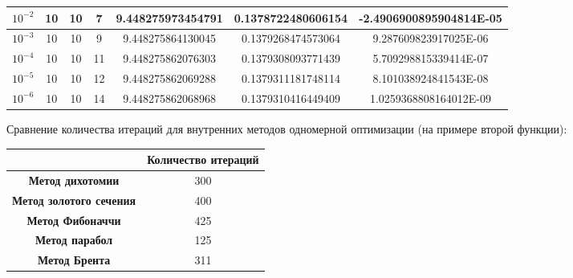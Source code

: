 \documentclass[12pt]{article}
\begin{document}
\begin{table}[H]
\begin{tabular}{|c|c|c|c|c|c|c|}
$10^{-2}$ & 10 & 10 & 7    & 9.448275973454791   & 0.1378722480606154  & -2.4906900895904814E-05 \\ \hline
$10^{-3}$ & 10 & 10 & 9    & 9.448275864130045   & 0.1379268474573064  & 9.287609823917025E-06   \\ \hline
$10^{-4}$ & 10 & 10 & 11   & 9.448275862076303   & 0.1379308093771439  & 5.709298815339414E-07   \\ \hline
$10^{-5}$ & 10 & 10 & 12   & 9.448275862069288   & 0.1379311181748114  & 8.101038924841543E-08   \\ \hline
$10^{-6}$ & 10 & 10 & 14   & 9.448275862068968   & 0.1379310416449409  & 1.0259368808164012E-09  \\ \hline
\end{tabular}
\end{table}

Сравнение количества итераций для внутренних методов одномерной оптимизации (на примере второй функции):

\begin{table}[h]
\begin{tabular}{|
>{\columncolor[HTML]{EED9C4}}c |c|}
\hline
\cellcolor[HTML]{EDE9E2}\textbf{} & \cellcolor[HTML]{FFF0DB}\textbf{Количество итераций} \\ \hline
\textbf{Метод дихотомии}        & 300 \\ \hline
\textbf{Метод золотого сечения} & 400 \\ \hline
\textbf{Метод Фибоначчи}        & 425 \\ \hline
\textbf{Метод парабол}          & 125 \\ \hline
\textbf{Метод Брента}           & 311 \\ \hline
\end{tabular}
\end{table}
\end{document}
